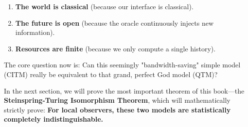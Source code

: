 \begin{enumerate}
\item \textbf{The world is classical} (because our interface is classical).

\item \textbf{The future is open} (because the oracle continuously injects new information).

\item \textbf{Resources are finite} (because we only compute a single history).
\end{enumerate}

The core question now is: Can this seemingly "bandwidth-saving" simple model (CITM) really be equivalent to that grand, perfect God model (QTM)?

In the next section, we will prove the most important theorem of this book—the \textbf{Steinspring-Turing Isomorphism Theorem}, which will mathematically strictly prove: \textbf{For local observers, these two models are statistically completely indistinguishable.}
